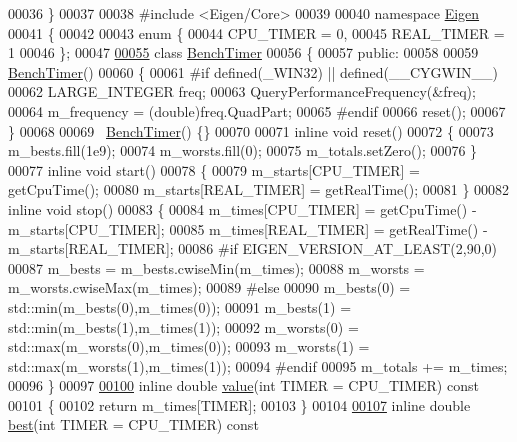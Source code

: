 \begin{DoxyCode}
00036 \}
00037 
00038 \textcolor{preprocessor}{#include <Eigen/Core>}
00039 
00040 \textcolor{keyword}{namespace }\hyperlink{namespace_eigen}{Eigen}
00041 \{
00042 
00043 \textcolor{keyword}{enum} \{
00044   CPU\_TIMER = 0,
00045   REAL\_TIMER = 1
00046 \};
00047 
\hyperlink{class_eigen_1_1_bench_timer}{00055} \textcolor{keyword}{class }\hyperlink{class_eigen_1_1_bench_timer}{BenchTimer}
00056 \{
00057 \textcolor{keyword}{public}:
00058 
00059   \hyperlink{class_eigen_1_1_bench_timer}{BenchTimer}()
00060   \{
00061 \textcolor{preprocessor}{#if defined(\_WIN32) || defined(\_\_CYGWIN\_\_)}
00062     LARGE\_INTEGER freq;
00063     QueryPerformanceFrequency(&freq);
00064     m\_frequency = (double)freq.QuadPart;
00065 #endif
00066     reset();
00067   \}
00068 
00069   ~\hyperlink{class_eigen_1_1_bench_timer}{BenchTimer}() \{\}
00070 
00071   \textcolor{keyword}{inline} \textcolor{keywordtype}{void} reset()
00072   \{
00073     m\_bests.fill(1e9);
00074     m\_worsts.fill(0);
00075     m\_totals.setZero();
00076   \}
00077   \textcolor{keyword}{inline} \textcolor{keywordtype}{void} start()
00078   \{
00079     m\_starts[CPU\_TIMER]  = getCpuTime();
00080     m\_starts[REAL\_TIMER] = getRealTime();
00081   \}
00082   \textcolor{keyword}{inline} \textcolor{keywordtype}{void} stop()
00083   \{
00084     m\_times[CPU\_TIMER] = getCpuTime() - m\_starts[CPU\_TIMER];
00085     m\_times[REAL\_TIMER] = getRealTime() - m\_starts[REAL\_TIMER];
00086 \textcolor{preprocessor}{    #if EIGEN\_VERSION\_AT\_LEAST(2,90,0)}
00087     m\_bests = m\_bests.cwiseMin(m\_times);
00088     m\_worsts = m\_worsts.cwiseMax(m\_times);
00089 \textcolor{preprocessor}{    #else}
00090     m\_bests(0) = std::min(m\_bests(0),m\_times(0));
00091     m\_bests(1) = std::min(m\_bests(1),m\_times(1));
00092     m\_worsts(0) = std::max(m\_worsts(0),m\_times(0));
00093     m\_worsts(1) = std::max(m\_worsts(1),m\_times(1));
00094 \textcolor{preprocessor}{    #endif}
00095     m\_totals += m\_times;
00096   \}
00097 
\hyperlink{class_eigen_1_1_bench_timer_a26760f963ed8b64c126159bfea57735e}{00100}   \textcolor{keyword}{inline} \textcolor{keywordtype}{double} \hyperlink{class_eigen_1_1_bench_timer_a26760f963ed8b64c126159bfea57735e}{value}(\textcolor{keywordtype}{int} TIMER = CPU\_TIMER)\textcolor{keyword}{ const}
00101 \textcolor{keyword}{  }\{
00102     \textcolor{keywordflow}{return} m\_times[TIMER];
00103   \}
00104 
\hyperlink{class_eigen_1_1_bench_timer_ae8b673b0fa356d3432c7a65c79e8af0e}{00107}   \textcolor{keyword}{inline} \textcolor{keywordtype}{double} \hyperlink{class_eigen_1_1_bench_timer_ae8b673b0fa356d3432c7a65c79e8af0e}{best}(\textcolor{keywordtype}{int} TIMER = CPU\_TIMER)\textcolor{keyword}{ const}

\end{DoxyCode}
